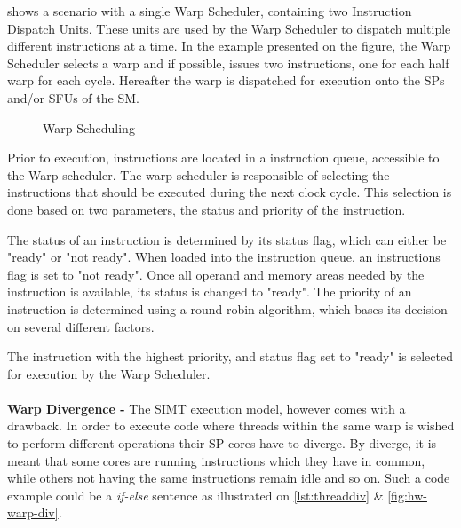  shows a scenario with a single Warp Scheduler, containing two Instruction Dispatch Units. 
These units are used by the Warp Scheduler to dispatch multiple different instructions at a time.
In the example presented on the figure, the Warp Scheduler selects a warp and if possible, issues two instructions, one for each half warp for each cycle.
Hereafter the warp is dispatched for execution onto the SPs and/or SFUs of the SM.

\begin{figure}[ht]
	\centering
	\caption{Warp Scheduling}
	\label{fig:hw-warp-scheduling}
\end{figure}


Prior to execution, instructions are located in a instruction queue, accessible to the Warp scheduler.
The warp scheduler is responsible of selecting the instructions that should be executed during the next clock cycle.
This selection is done based on two parameters, the status and priority of the instruction.

The status of an instruction is determined by its status flag, which can either be "ready" or "not ready".
When loaded into the instruction queue, an instructions flag is set to "not ready".
Once all operand and memory areas needed by the instruction is available, its status is changed to "ready".
The priority of an instruction is determined using a round-robin algorithm, which bases its decision on several different factors.

The instruction with the highest priority, and status flag set to "ready" is selected for execution by the Warp Scheduler.
\\\\
\textbf{Warp Divergence -} The SIMT execution model, however comes with a drawback.
In order to execute code where threads within the same warp is wished to perform different operations their SP cores have to diverge.
By diverge, it is meant that some cores are running instructions which they have in common, while others not having the same instructions remain idle and so on.
Such a code example could be a \textit{if-else} sentence as illustrated on
\autoref{lst:threaddiv} \& \cref{fig:hw-warp-div}.


